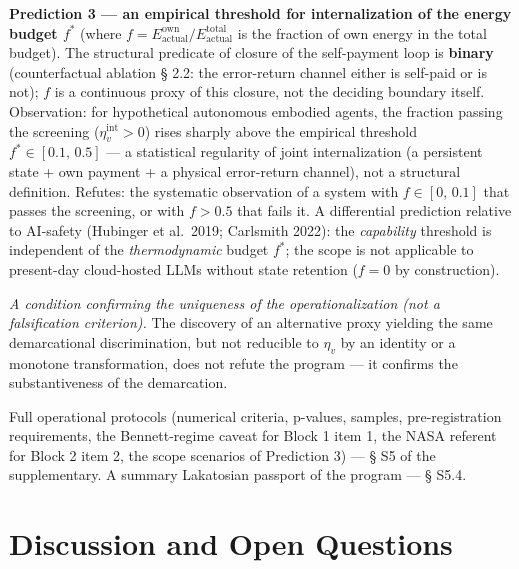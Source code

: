 \documentclass[pdflatex,sn-mathphys-ay]{sn-jnl}
\begin{document}
\begin{enumerate}
  \textbf{Prediction 3 --- an empirical threshold for internalization of the energy budget \(f^*\)} (where \(f = E_{\text{actual}}^{\text{own}}/E_{\text{actual}}^{\text{total}}\) is the fraction of own energy in the total budget). The structural predicate of closure of the self-payment loop is \textbf{binary} (counterfactual ablation § 2.2: the error-return channel either is self-paid or is not); \(f\) is a continuous proxy of this closure, not the deciding boundary itself. Observation: for hypothetical autonomous embodied agents, the fraction passing the screening (\(\eta_v^{\text{int}} > 0\)) rises sharply above the empirical threshold \(f^* \in [0.1,\, 0.5]\) --- a statistical regularity of joint internalization (a persistent state + own payment + a physical error-return channel), not a structural definition. Refutes: the systematic observation of a system with \(f \in [0,\, 0.1]\) that passes the screening, or with \(f > 0.5\) that fails it. A differential prediction relative to AI-safety (Hubinger et al.~2019; Carlsmith 2022): the \emph{capability} threshold is independent of the \emph{thermodynamic} budget \(f^*\); the scope is not applicable to present-day cloud-hosted LLMs without state retention (\(f = 0\) by construction).
\end{enumerate}

\emph{A condition confirming the uniqueness of the operationalization (not a falsification criterion).} The discovery of an alternative proxy yielding the same demarcational discrimination, but not reducible to \(\eta_v\) by an identity or a monotone transformation, does not refute the program --- it confirms the substantiveness of the demarcation.

Full operational protocols (numerical criteria, p-values, samples, pre-registration requirements, the Bennett-regime caveat for Block 1 item 1, the NASA referent for Block 2 item 2, the scope scenarios of Prediction 3) --- § S5 of the supplementary. A summary Lakatosian passport of the program --- § S5.4.

\section{Discussion and Open Questions}\label{discussion-and-open-questions}
\end{document}
